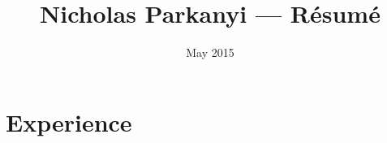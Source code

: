 \documentclass[12pt,letterpaper,notitlepage]{article}
\begin{document}
\title{Nicholas Parkanyi --- R\'{e}sum\'{e}}
\date{May 2015}

\maketitle

\section*{Experience}
\end{document}
